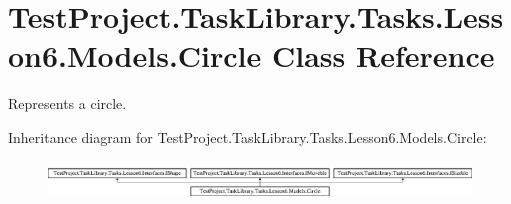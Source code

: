 \hypertarget{class_test_project_1_1_task_library_1_1_tasks_1_1_lesson6_1_1_models_1_1_circle}{}\section{Test\+Project.\+Task\+Library.\+Tasks.\+Lesson6.\+Models.\+Circle Class Reference}
\label{class_test_project_1_1_task_library_1_1_tasks_1_1_lesson6_1_1_models_1_1_circle}


Represents a circle.  


Inheritance diagram for Test\+Project.\+Task\+Library.\+Tasks.\+Lesson6.\+Models.\+Circle\+:\begin{figure}[H]
\begin{center}
\leavevmode
\includegraphics[height=1.045752cm]{class_test_project_1_1_task_library_1_1_tasks_1_1_lesson6_1_1_models_1_1_circle}
\end{center}
\end{figure}
